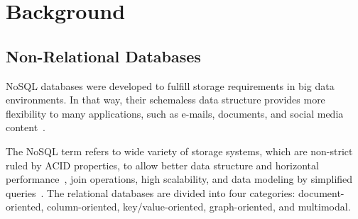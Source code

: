 \documentclass{svproc}
\begin{document}
\section{Background}
\label{section:fundamentacao}


\subsection{Non-Relational Databases}
\label{subsection:nao-relacional}


NoSQL databases were developed to fulfill storage requirements in big data environments. In that way, their schemaless data structure provides more flexibility to many applications, such as e-mails, documents, and social media content~\cite{mohamed:2014,ramesh:2016}.

The NoSQL term refers to wide variety of storage systems, which are non-strict ruled by ACID properties, to allow better data structure and horizontal performance~\cite{rafique:2018}, join operations, high scalability, and data modeling by simplified queries~\cite{ramesh:2016}.
The relational databases are divided into four categories: document-oriented, column-oriented, key/value-oriented, graph-oriented, and multimodal.

\end{document}
